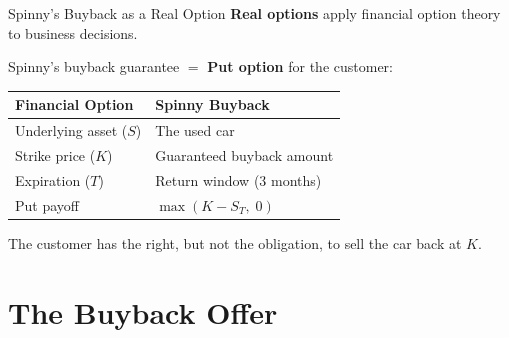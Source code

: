 \documentclass[11pt, aspectratio=43]{beamer}
\begin{document}
\begin{frame}{Spinny's Buyback as a Real Option}
    \textbf{Real options} apply financial option theory to business decisions.

    \vspace{0.8em}
    Spinny's buyback guarantee $=$ \textbf{Put option} for the customer:

    \vspace{0.5em}
    \begin{table}
        \centering
        \begin{tabular}{@{}ll@{}}
            \toprule
            \textbf{Financial Option} & \textbf{Spinny Buyback} \\
            \midrule
            Underlying asset ($S$) & The used car \\
            Strike price ($K$) & Guaranteed buyback amount \\
            Expiration ($T$) & Return window (3 months) \\
            Put payoff & $\max(K - S_T, \; 0)$ \\
            \bottomrule
        \end{tabular}
    \end{table}

    \vspace{0.5em}
    The customer has the right, but not the obligation, to sell the car back at $K$.
\end{frame}


\section{The Buyback Offer}
\end{document}
